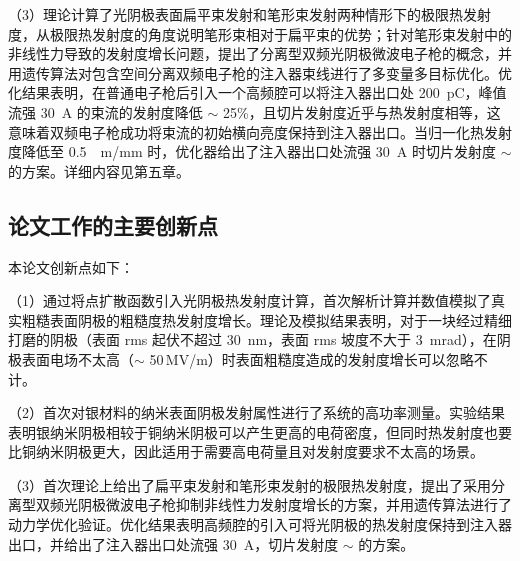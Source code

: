 （3）理论计算了光阴极表面扁平束发射和笔形束发射两种情形下的极限热发射度，从极限热发射度的角度说明笔形束相对于扁平束的优势；针对笔形束发射中的非线性力导致的发射度增长问题，提出了分离型双频光阴极微波电子枪的概念，并用遗传算法对包含空间分离双频电子枪的注入器束线进行了多变量多目标优化。优化结果表明，在普通电子枪后引入一个高频腔可以将注入器出口处 \SI{200}{pC}，峰值流强 \SI{30}{A} 的束流的发射度降低 $\sim$ 25\%，且切片发射度近乎与热发射度相等，这意味着双频电子枪成功将束流的初始横向亮度保持到注入器出口。当归一化热发射度降低至 \SI{0.5}{\mu m/mm} 时，优化器给出了注入器出口处流强 \SI{30}{A} 时切片发射度 $\sim$  的方案。详细内容见第五章。

\subsection{论文工作的主要创新点}
本论文创新点如下：

（1）通过将点扩散函数引入光阴极热发射度计算，首次解析计算并数值模拟了真实粗糙表面阴极的粗糙度热发射度增长。理论及模拟结果表明，对于一块经过精细打磨的阴极（表面 rms 起伏不超过 \SI{30}{nm}，表面 rms 坡度不大于 \SI{3}{mrad}），在阴极表面电场不太高（$\sim$ 50\,MV/m）时表面粗糙度造成的发射度增长可以忽略不计。

（2）首次对银材料的纳米表面阴极发射属性进行了系统的高功率测量。实验结果表明银纳米阴极相较于铜纳米阴极可以产生更高的电荷密度，但同时热发射度也要比铜纳米阴极更大，因此适用于需要高电荷量且对发射度要求不太高的场景。

（3）首次理论上给出了扁平束发射和笔形束发射的极限热发射度，提出了采用分离型双频光阴极微波电子枪抑制非线性力发射度增长的方案，并用遗传算法进行了动力学优化验证。优化结果表明高频腔的引入可将光阴极的热发射度保持到注入器出口，并给出了注入器出口处流强 \SI{30}{A}，切片发射度 $\sim$  的方案。
